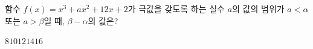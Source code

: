 함수 $f(x)=x^3+ax^2+12x+2$가 극값을 갖도록 하는 실수 $a$의 값의 범위가 $a<\alpha$ 또는 $a>\beta$일 때, $\beta-\alpha$의 값은?
\begin{choices32}{$8$}{$10$}{$12$}{$14$}{$16$}\end{choices32}
